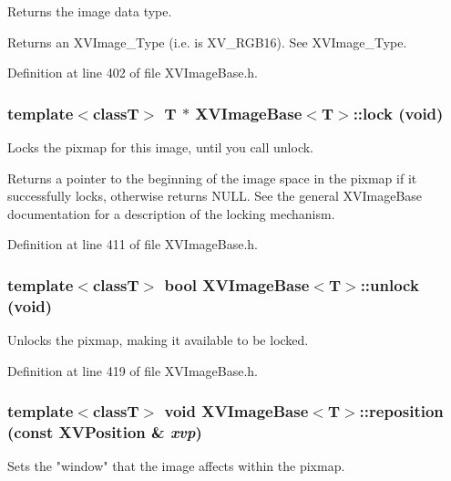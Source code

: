 Returns the image data type.

Returns an XVImage\_\-Type (i.e. is XV\_\-RGB16). See XVImage\_\-Type. 

Definition at line 402 of file XVImage\-Base.h.\label{XVImageBase_a6}
\hypertarget{class_XVImageBase_a6}{
\subsubsection[lock]{\setlength{\rightskip}{0pt plus 5cm}template$<$classT$>$ T $\ast$ XVImage\-Base$<$T$>$::lock (void)}}


Locks the pixmap for this image, until you call unlock.

Returns a pointer to the beginning of the image space in the pixmap if it successfully locks, otherwise returns NULL. See the general XVImage\-Base documentation for a description of the locking mechanism. 

Definition at line 411 of file XVImage\-Base.h.\label{XVImageBase_a7}
\hypertarget{class_XVImageBase_a7}{
\subsubsection[unlock]{\setlength{\rightskip}{0pt plus 5cm}template$<$classT$>$ bool XVImage\-Base$<$T$>$::unlock (void)}}


Unlocks the pixmap, making it available to be locked.



Definition at line 419 of file XVImage\-Base.h.\label{XVImageBase_a8}
\hypertarget{class_XVImageBase_a8}{
\subsubsection[reposition]{\setlength{\rightskip}{0pt plus 5cm}template$<$classT$>$ void XVImage\-Base$<$T$>$::reposition (const XVPosition \& {\em xvp})}}


Sets the "window" that the image affects within the pixmap.

